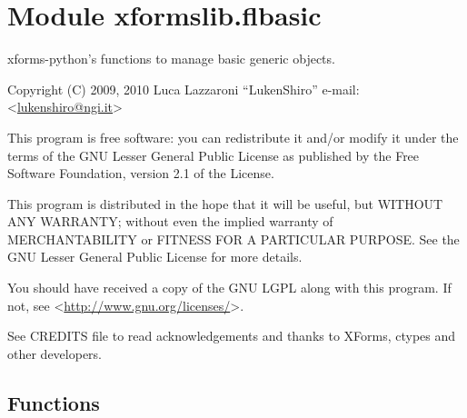 %
%
%


\section{Module xformslib.flbasic}

    \label{xformslib:flbasic}

xforms-python's functions to manage basic generic objects.

Copyright (C) 2009, 2010  Luca Lazzaroni ``LukenShiro''
e-mail: <\href{mailto:lukenshiro@ngi.it}{lukenshiro@ngi.it}>

This program is free software: you can redistribute it and/or modify
it under the terms of the GNU Lesser General Public License as
published by the Free Software Foundation, version 2.1 of the License.

This program is distributed in the hope that it will be useful,
but WITHOUT ANY WARRANTY; without even the implied warranty of
MERCHANTABILITY or FITNESS FOR A PARTICULAR PURPOSE. See the
GNU Lesser General Public License for more details.

You should have received a copy of the GNU LGPL along with this
program. If not, see <\href{http://www.gnu.org/licenses/}{http://www.gnu.org/licenses/}>.

See CREDITS file to read acknowledgements and thanks to XForms,
ctypes and other developers.


  \subsection{Functions}

    \label{xformslib:flbasic:FL_IS_UPBOX}

